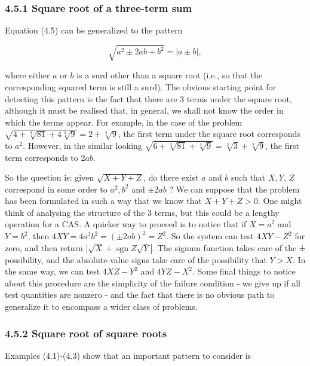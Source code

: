 \documentclass[11pt,letterpaper]{article}
\begin{document}
\subsubsection*{4.5.1 Square root of a three-term sum}

Equation (4.5) can be generalized to the pattern


\begin{equation*}
\sqrt{a^{2} \pm 2 a b+b^{2}}=|a \pm b|, \tag{4.8}\label{eq:4.8}
\end{equation*}


where either $a$ or $b$ is a surd other than a square root (i.e., so that the corresponding squared term is still a surd). The obvious starting point for detecting this pattern is the fact that there are 3 terms under the square root, although it must be realised that, in general, we shall not know the order in which the terms appear. For example, in the case of the problem $\sqrt{4+\sqrt[3]{81}+4 \sqrt[3]{9}}=2+\sqrt[3]{9}$, the first term under the square root corresponds to $a^2$. However, in the similar looking $\sqrt{6+\sqrt[3]{81}+\sqrt[3]{9}}=\sqrt[3]{3}+\sqrt[3]{9}$, the first term corresponds to $2 a b$.

So the question is: given $\sqrt{X+Y+Z}$, do there exist $a$ and $b$ such that $X, Y$, $Z$ correspond in some order to $a^{2}, b^{2}$ and $\pm 2 a b$ ? We can suppose that the problem has been formulated in such a way that we know that $X+Y+Z>0$. One might think of analysing the structure of the 3 terms, but this could be a lengthy operation for a CAS. A quicker way to proceed is to notice that if $X=a^{2}$ and $Y=b^{2}$, then $4 X Y=4 a^{2} b^{2}=( \pm 2 a b)^{2}=Z^{2}$. So the system can test $4 X Y-Z^{2}$ for zero, and then return $|\sqrt{X}+\operatorname{sgn} Z \sqrt{Y}|$. The signum function takes care of the ± possibility, and the absolute-value signs take care of the possibility that $Y>X$. In the same way, we can test $4 X Z-Y^{2}$ and $4 Y Z-X^{2}$. Some final things to notice about this procedure are the simplicity of the failure condition - we give up if all test quantities are nonzero - and the fact that there is no obvious path to generalize it to encompass a wider class of problems.

\subsubsection*{4.5.2 Square root of square roots}

Examples (4.1)-(4.3) show that an important pattern to consider is
\end{document}

